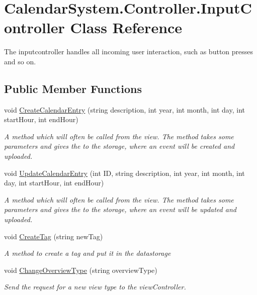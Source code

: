 \hypertarget{class_calendar_system_1_1_controller_1_1_input_controller}{\section{Calendar\+System.\+Controller.\+Input\+Controller Class Reference}
\label{class_calendar_system_1_1_controller_1_1_input_controller}
}


The inputcontroller handles all incoming user interaction, such as button presses and so on.  


\subsection*{Public Member Functions}
\begin{DoxyCompactItemize}
\item 
void \hyperlink{class_calendar_system_1_1_controller_1_1_input_controller_a6a6b437e915b97c6ca03b846baeffbef}{Create\+Calendar\+Entry} (string description, int year, int month, int day, int start\+Hour, int end\+Hour)
\begin{DoxyCompactList}\small\item\em A method which will often be called from the view. The method takes some parameters and gives the to the storage, where an event will be created and uploaded. \end{DoxyCompactList}\item 
void \hyperlink{class_calendar_system_1_1_controller_1_1_input_controller_a600a42ef535df171f500022244b7d432}{Update\+Calendar\+Entry} (int I\+D, string description, int year, int month, int day, int start\+Hour, int end\+Hour)
\begin{DoxyCompactList}\small\item\em A method which will often be called from the view. The method takes some parameters and gives the to the storage, where an event will be updated and uploaded. \end{DoxyCompactList}\item 
void \hyperlink{class_calendar_system_1_1_controller_1_1_input_controller_ab7b792da94ca5d8cfffacb501c97be0c}{Create\+Tag} (string new\+Tag)
\begin{DoxyCompactList}\small\item\em A method to create a tag and put it in the datastorage \end{DoxyCompactList}\item 
void \hyperlink{class_calendar_system_1_1_controller_1_1_input_controller_aaf0f1ccecfd2ba1d09759d4d58b39f34}{Change\+Overview\+Type} (string overview\+Type)
\begin{DoxyCompactList}\small\item\em Send the request for a new view type to the view\+Controller. \end{DoxyCompactList}\end{DoxyCompactItemize}
